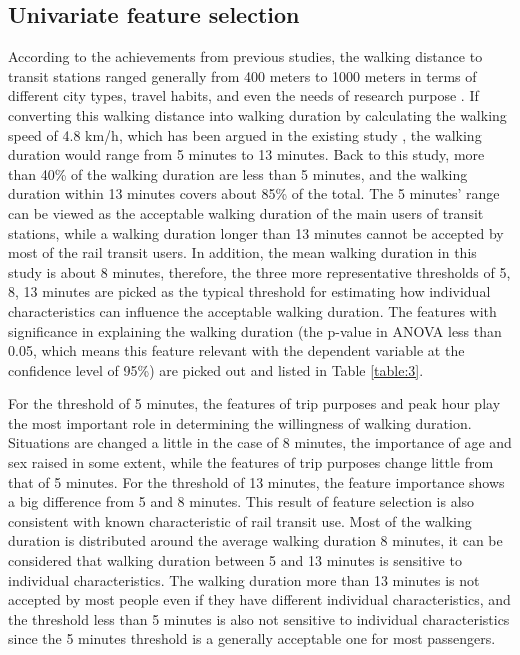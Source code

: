 \documentclass[Journal,letterpaper]{ascelike-new}
\begin{document}
%
\subsection{Univariate feature selection}
According to the achievements from previous studies, the walking distance to transit stations ranged generally from 400 meters to 1000 meters in terms of different city types, travel habits, and even the needs of research purpose \cite{Guerra2012,Murray1998,OSullivan1996,Keijer2000,Zhao2003,Alshalalfah2007}. If converting this walking distance into walking duration by calculating the walking speed of 4.8 km/h, which has been argued in the existing study \cite{Bohannon1997}, the walking duration would range from 5 minutes to 13 minutes. Back to this study, more than 40\% of the walking duration are less than 5 minutes, and the walking duration within 13 minutes covers about 85\% of the total. The 5 minutes’ range can be viewed as the acceptable walking duration of the main users of transit stations, while a walking duration longer than 13 minutes cannot be accepted by most of the rail transit users. In addition, the mean walking duration in this study is about 8 minutes, therefore, the three more representative thresholds of 5, 8, 13 minutes are picked as the typical threshold for estimating how individual characteristics can influence the acceptable walking duration. The features with significance in explaining the walking duration (the p-value in ANOVA less than 0.05, which means this feature relevant with the dependent variable at the confidence level of 95\%) are picked out and listed in Table \ref{table:3}.

%
For the threshold of 5 minutes, the features of trip purposes and peak hour play the most important role in determining the willingness of walking duration. Situations are changed a little in the case of 8 minutes, the importance of age and sex raised in some extent, while the features of trip purposes change little from that of 5 minutes. For the threshold of 13 minutes, the feature importance shows a big difference from 5 and 8 minutes. This result of feature selection is also consistent with known characteristic of rail transit use. Most of the walking duration is distributed around the average walking duration 8 minutes, it can be considered that walking duration between 5 and 13 minutes is sensitive to individual characteristics. The walking duration more than 13 minutes is not accepted by most people even if they have different individual characteristics, and the threshold less than 5 minutes is also not sensitive to individual characteristics since the 5 minutes threshold is a generally acceptable one for most passengers.
\end{document}

